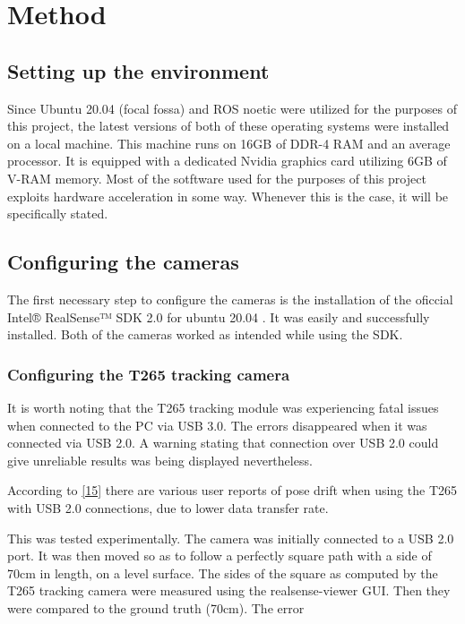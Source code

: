 \documentclass{article}
\begin{document}
\section{Method}

\subsection{Setting up the environment}

Since Ubuntu 20.04 (focal fossa) and ROS noetic were utilized for the purposes of this project, the latest versions of both of these operating systems were installed on a local machine. This machine runs on 16GB of DDR-4 RAM and an average processor. It is equipped with a dedicated Nvidia graphics card utilizing 6GB of V-RAM memory. Most of the sotftware used for the purposes of this project exploits hardware acceleration in some way. Whenever this is the case, it will be specifically stated.

\subsection{Configuring the cameras}

The first necessary step to configure the cameras is the installation of the oficcial Intel® RealSense™ SDK 2.0 for ubuntu 20.04 . It was easily and successfully installed. Both of the cameras worked as intended while using the SDK.
\subsubsection{Configuring the T265 tracking camera}
It is worth noting that the T265 tracking module was experiencing fatal issues when connected to the PC via USB 3.0. The errors disappeared when it was connected via USB 2.0. A warning stating that connection over USB 2.0 could give unreliable results was being displayed nevertheless.

According to \href{https://support.intelrealsense.com/hc/en-us/community/posts/360038384494-USB-2-for-T265}{[15]} there are various user reports of pose drift when using the T265 with USB 2.0 connections, due to lower data transfer rate. 

This was tested experimentally. The camera was initially connected to a USB 2.0 port. It was then moved so as to follow a perfectly square path with a side of 70cm in length, on a level surface. The sides of the square as computed by the T265 tracking camera were measured using the realsense-viewer GUI. Then they were compared to the ground truth (70cm). The error 
\end{document}
